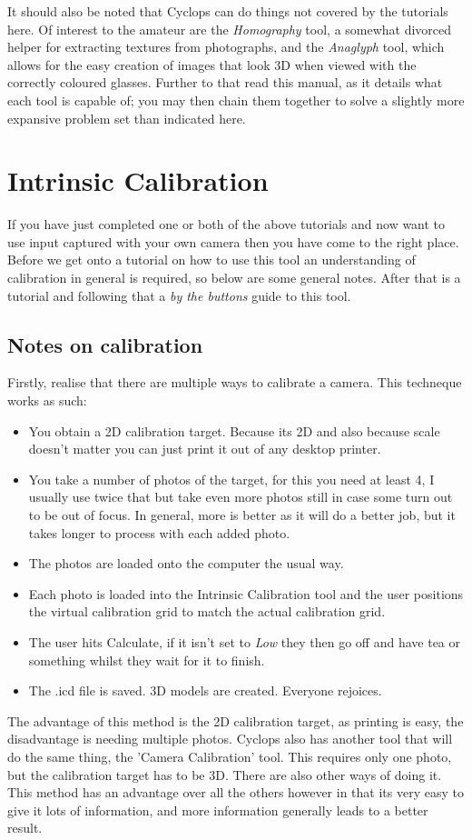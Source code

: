 \documentclass[10pt,a4paper,twoside]{article}
\begin{document}
It should also be noted that Cyclops can do things not covered by the tutorials here. Of interest to the amateur are the \emph{Homography} tool, a somewhat divorced helper for extracting textures from photographs, and the \emph{Anaglyph} tool, which allows for the easy creation of images that look 3D when viewed with the correctly coloured glasses. Further to that read this manual, as it details what each tool is capable of; you may then chain them together to solve a slightly more expansive problem set than indicated here.


\section{Intrinsic Calibration}
\label{intrinsic_calib}
If you have just completed one or both of the above tutorials and now want to use input captured with your own camera then you have come to the right place. Before we get onto a tutorial on how to use this tool an understanding of calibration in general is required, so below are some general notes. After that is a tutorial and following that a \emph{by the buttons} guide to this tool.

\subsection{Notes on calibration}
Firstly, realise that there are multiple ways to calibrate a camera. This techneque works as such:
\begin{itemize}
\item You obtain a 2D calibration target. Because its 2D and also because scale doesn't matter you can just print it out of any desktop printer.
\item You take a number of photos of the target, for this you need at least 4, I usually use twice that but take even more photos still in case some turn out to be out of focus. In general, more is better as it will do a better job, but it takes longer to process with each added photo.
\item The photos are loaded onto the computer the usual way.
\item Each photo is loaded into the Intrinsic Calibration tool and the user positions the virtual calibration grid to match the actual calibration grid.
\item The user hits Calculate, if it isn't set to \emph{Low} they then go off and have tea or something whilst they wait for it to finish.
\item The .icd file is saved. 3D models are created. Everyone rejoices.
\end{itemize}
The advantage of this method is the 2D calibration target, as printing is easy, the disadvantage is needing multiple photos. Cyclops also has another tool that will do the same thing, the 'Camera Calibration' tool. This requires only one photo, but the calibration target has to be 3D. There are also other ways of doing it. This method has an advantage over all the others however in that its very easy to give it lots of information, and more information generally leads to a better result.
\end{document}
